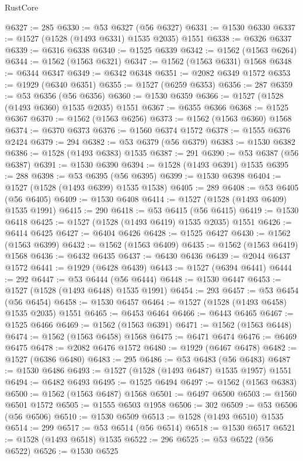 \begin{lexlean}{RustCore}
\begin{coremodule}
@6327 := 285
@6330 := @53 @6327 (@56 @6327)
@6331 := @1530 @6330
@6337 := @1527 (@1528 (@1493 @6331) @1535 @2035) @1551
@6338 := @6326 @6337
@6339 := @6316 @6338
@6340 := @1525 @6339
@6342 := @1562 (@1563 @6264)
@6344 := @1562 (@1563 @6321)
@6347 := @1562 (@1563 @6331) @1568
@6348 := @6344 @6347
@6349 := @6342 @6348
@6351 := @2082 @6349 @1572
@6353 := @1929 (@6340 @6351)
@6355 := @1527 (@6259 @6353)
@6356 := 287
@6359 := @53 @6356 (@56 @6356)
@6360 := @1530 @6359
@6366 := @1527 (@1528 (@1493 @6360) @1535 @2035) @1551
@6367 := @6355 @6366
@6368 := @1525 @6367
@6370 := @1562 (@1563 @6256)
@6373 := @1562 (@1563 @6360) @1568
@6374 := @6370 @6373
@6376 := @1560 @6374 @1572
@6378 := @1555 @6376 @2424
@6379 := 294
@6382 := @53 @6379 (@56 @6379)
@6383 := @1530 @6382
@6386 := @1528 (@1493 @6383) @1535
@6387 := 291
@6390 := @53 @6387 (@56 @6387)
@6391 := @1530 @6390
@6394 := @1528 (@1493 @6391) @1535
@6395 := 288
@6398 := @53 @6395 (@56 @6395)
@6399 := @1530 @6398
@6404 := @1527 (@1528 (@1493 @6399) @1535 @1538)
@6405 := 289
@6408 := @53 @6405 (@56 @6405)
@6409 := @1530 @6408
@6414 := @1527 (@1528 (@1493 @6409) @1535 @1991)
@6415 := 290
@6418 := @53 @6415 (@56 @6415)
@6419 := @1530 @6418
@6425 := @1527 (@1528 (@1493 @6419) @1535 @2035) @1551
@6426 := @6414 @6425
@6427 := @6404 @6426
@6428 := @1525 @6427
@6430 := @1562 (@1563 @6399)
@6432 := @1562 (@1563 @6409)
@6435 := @1562 (@1563 @6419) @1568
@6436 := @6432 @6435
@6437 := @6430 @6436
@6439 := @2044 @6437 @1572
@6441 := @1929 (@6428 @6439)
@6443 := @1527 (@6394 @6441)
@6444 := 292
@6447 := @53 @6444 (@56 @6444)
@6448 := @1530 @6447
@6453 := @1527 (@1528 (@1493 @6448) @1535 @1991)
@6454 := 293
@6457 := @53 @6454 (@56 @6454)
@6458 := @1530 @6457
@6464 := @1527 (@1528 (@1493 @6458) @1535 @2035) @1551
@6465 := @6453 @6464
@6466 := @6443 @6465
@6467 := @1525 @6466
@6469 := @1562 (@1563 @6391)
@6471 := @1562 (@1563 @6448)
@6474 := @1562 (@1563 @6458) @1568
@6475 := @6471 @6474
@6476 := @6469 @6475
@6478 := @2082 @6476 @1572
@6480 := @1929 (@6467 @6478)
@6482 := @1527 (@6386 @6480)
@6483 := 295
@6486 := @53 @6483 (@56 @6483)
@6487 := @1530 @6486
@6493 := @1527 (@1528 (@1493 @6487) @1535 @1957) @1551
@6494 := @6482 @6493
@6495 := @1525 @6494
@6497 := @1562 (@1563 @6383)
@6500 := @1562 (@1563 @6487) @1568
@6501 := @6497 @6500
@6503 := @1560 @6501 @1572
@6505 := @1555 @6503 @1958
@6506 := 302
@6509 := @53 @6506 (@56 @6506)
@6510 := @1530 @6509
@6513 := @1528 (@1493 @6510) @1535
@6514 := 299
@6517 := @53 @6514 (@56 @6514)
@6518 := @1530 @6517
@6521 := @1528 (@1493 @6518) @1535
@6522 := 296
@6525 := @53 @6522 (@56 @6522)
@6526 := @1530 @6525

\end{coremodule}
\end{lexlean}
